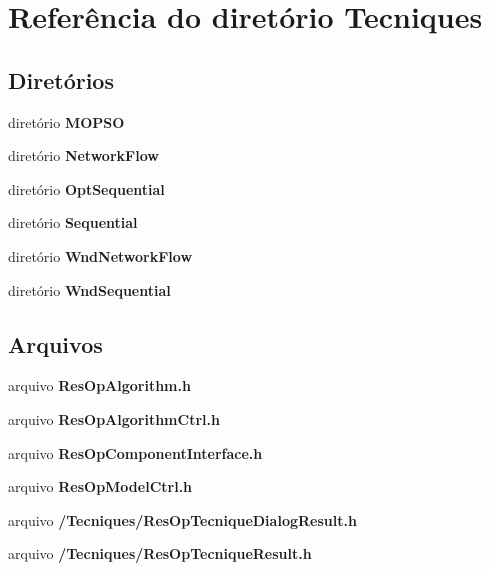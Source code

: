 \section{Referência do diretório Tecniques}
\label{dir_cd94cd08e8f6a8a1cc120f8abd96072f}
\subsection*{Diretórios}
\begin{DoxyCompactItemize}
\item 
diretório {\bf M\+O\+P\+SO}
\item 
diretório {\bf Network\+Flow}
\item 
diretório {\bf Opt\+Sequential}
\item 
diretório {\bf Sequential}
\item 
diretório {\bf Wnd\+Network\+Flow}
\item 
diretório {\bf Wnd\+Sequential}
\end{DoxyCompactItemize}
\subsection*{Arquivos}
\begin{DoxyCompactItemize}
\item 
arquivo {\bf Res\+Op\+Algorithm.\+h}
\item 
arquivo {\bf Res\+Op\+Algorithm\+Ctrl.\+h}
\item 
arquivo {\bf Res\+Op\+Component\+Interface.\+h}
\item 
arquivo {\bf Res\+Op\+Model\+Ctrl.\+h}
\item 
arquivo {\bf /\+Tecniques/\+Res\+Op\+Tecnique\+Dialog\+Result.\+h}
\item 
arquivo {\bf /\+Tecniques/\+Res\+Op\+Tecnique\+Result.\+h}
\end{DoxyCompactItemize}
